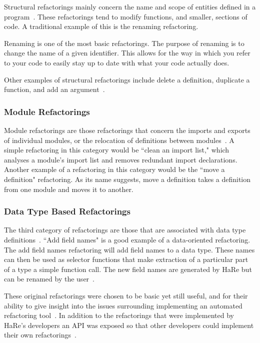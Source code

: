 Structural refactorings mainly concern the name and scope of entities defined in a program~\citep{huiqingThesis}. These refactorings tend to modify functions, and smaller, sections of code. A traditional example of this is the renaming refactoring. 

Renaming is one of the most basic refactorings. The purpose of renaming is to change the name of a given identifier. This allows for the way in which you refer to your code to easily stay up to date with what your code actually does. 

Other examples of structural refactorings include delete a definition, duplicate a function, and add an argument~\citep{huiqingThesis}.

\subsubsection{Module Refactorings}

Module refactorings are those refactorings that concern the imports and exports of individual modules, or the relocation of definitions between modules~\citep{huiqingThesis}. A simple refactoring in this category would be ``clean an import list," which analyses a module's import list and removes redundant import declarations. Another example of a refactoring in this category would be the ``move a definition" refactoring. As its name suggests, move a definition takes a definition from one module and moves it to another.

\subsubsection{Data Type Based Refactorings}

The third category of refactorings are those that are associated with data type definitions~\citep{huiqingThesis}. ``Add field names" is a good example of a data-oriented refactoring.  The add field names refactoring will add field names to a data type. These names can then be used as selector functions that make extraction of a particular part of a type a simple function call. The new field names are generated by HaRe but can be renamed by the user~\citep{huiqingThesis}.

These original refactorings were chosen to be basic yet still useful, and for their ability to give insight into the issues surrounding implementing an automated refactoring tool~\citep{huiqingThesis}. In addition to the refactorings that were implemented by HaRe's developers an API was exposed so that other developers could implement their own refactorings~\citep{hareApi}.


